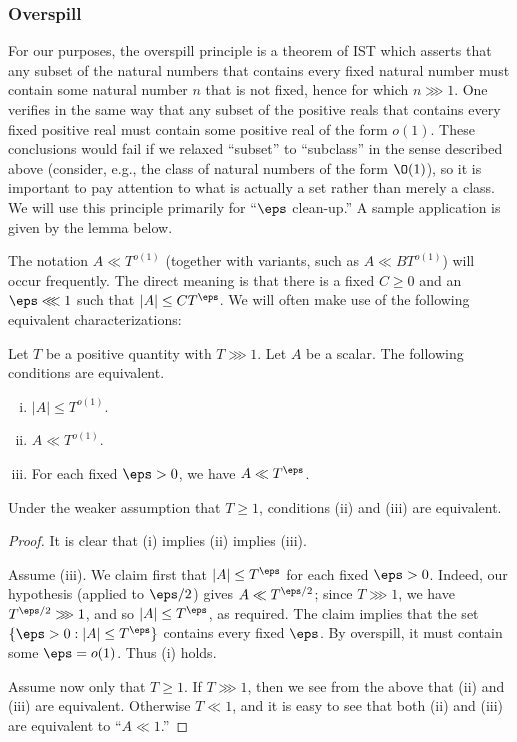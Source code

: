 \subsubsection{Overspill}
For our purposes, the overspill principle is a theorem of IST \cite[Thm 1.1]{MR469763} which asserts that any subset of the natural numbers that contains every fixed natural number must contain some natural number $n$ that is not fixed, hence for which $n \ggg 1$.  One verifies in the same way that any subset of the positive reals that contains every fixed positive real must contain some positive real of the form $o(1)$.  These conclusions would fail if we relaxed ``subset'' to ``subclass'' in the sense described above (consider, e.g., the class of natural numbers of the form $\O(1)$), so it is important to pay attention to what is actually a set rather than merely a class.  We will use this principle primarily for ``$\eps$ clean-up.''  A sample application is given by the lemma below.

The notation $A \ll T^{o(1)}$ (together with variants, such as $A \ll B T^{o(1)}$) will occur frequently.  The direct meaning is that there is a fixed $C \geq 0$ and an $\eps \lll 1$ such that $|A| \leq C T^{\eps}$.  We will often make use of the following equivalent characterizations:
\begin{lemma}\label{lem:overspill-A-vs-T-eps}
  Let $T$ be a positive quantity with $T \ggg 1$.  Let $A$ be a scalar.  The following conditions are equivalent.
  \begin{enumerate}[(i)]
  \item $|A| \leq T^{o(1)}$.
  \item $A \ll T^{o(1)}$.
  \item For each fixed $\eps > 0$, we have $A \ll T^{\eps}$.
  \end{enumerate}
  Under the weaker assumption that $T \geq 1$, conditions (ii) and (iii) are equivalent.
\end{lemma}
\begin{proof}
  It is clear that (i) implies (ii) implies (iii).

  Assume (iii).  We claim first that $|A| \leq T^\eps$ for each fixed $\eps > 0$.  Indeed, our hypothesis (applied to $\eps/2$) gives $A \ll T^{\eps/2}$; since $T \ggg 1$, we have $T^{\eps/2} \ggg 1$, and so $|A| \leq T^{\eps}$, as required.  The claim implies that the set $\{\eps > 0 : |A| \leq T^{\eps}\}$ contains every fixed $\eps$.  By overspill, it must contain some $\eps = o(1)$.  Thus (i) holds.

  Assume now only that $T \geq 1$.  If $T \ggg 1$, then we see from the above that (ii) and (iii) are equivalent.  Otherwise $T \ll 1$, and it is easy to see that both (ii) and (iii) are equivalent to ``$A \ll 1$.''
\end{proof}

